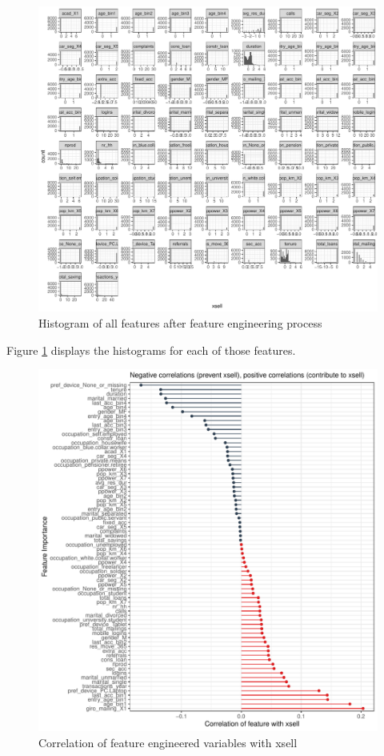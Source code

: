 \documentclass[12pt,a4paper]{article}
\begin{document}
\begin{figure}[ht]
	\centering
  \includegraphics[scale=0.63]{figures/hist_all_features.pdf}
	\caption{Histogram of all features after feature engineering process}
	\label{fig_hist}
\end{figure}Figure \ref{fig_hist} displays the histograms for each
of those features.

\begin{figure}[ht]
	\centering
  \includegraphics[scale=0.8]{figures/corrplot.pdf}
	\caption{Correlation of feature engineered variables with xsell}
	\label{fig_corr}
\end{figure}
\end{document}
